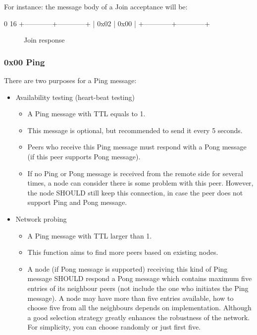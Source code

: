 \documentclass[12pt, a4paper]{article}
\begin{document}
For instance: the message body of a Join acceptance will be:
\begin{verbbox}
0                          16
+------------+------------+
|    0x02    |    0x00    |
+------------+------------+
\end{verbbox}

\begin{figure}[h!]
  \centering
  \theverbbox
  \label{header}
  \caption{Join response}
\end{figure}



\subsubsection{0x00 Ping}
There are two purposes for a Ping message:
\begin{itemize}
\item Availability testing (heart-beat testing)
\begin{itemize}
\item A Ping message with TTL equals to 1.
\item This message is optional, but recommended to send it every 5 seconds.
\item Peers who receive this Ping message must respond with a Pong message (if this peer supports Pong message).
\item If no Ping or Pong message is received from the remote side for several times, a node can consider there is some problem with this peer.
However, the node SHOULD still keep this connection, in case the peer does not support Ping and Pong message.
\end{itemize}
\item Network probing
\begin{itemize}
\item A Ping message with TTL larger than 1.
\item This function aims to find more peers based on existing nodes.
\item A node (if Pong message is supported) receiving this kind of Ping message SHOULD respond a Pong message which contains maximum five entries of its neighbour peers (not include the one who initiates the Ping message).
A node may have more than five entries available, how to choose five from all the neighbours depends on implementation.
Although a good selection strategy greatly enhances the robustness of the network.
For simplicity, you can choose randomly or just first five.
\end{itemize}
\end{itemize}
\end{document}
